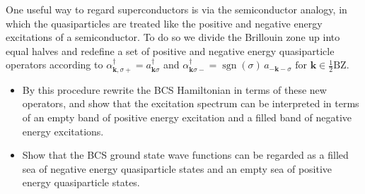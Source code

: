 \begin{Problem}

One useful way to regard superconductors is via the semiconductor analogy, in which the quasiparticles are treated like the positive and negative energy excitations of a semiconductor. To do so we divide the Brillouin zone up into equal halves and redefine a set of positive and negative energy quasiparticle operators according to
$\alpha^\dagger_{\mathbf{k},\sigma+} = a^\dagger_{\mathbf{k}\sigma}$ and $\alpha^\dagger_{\mathbf{k}\sigma-} = \operatorname{sgn}(\sigma)\,a_{-\mathbf{k}-\sigma}
\text{ for } \mathbf{k} \in \tfrac12 \mathrm{BZ}.$

\begin{itemize}
\item By this procedure rewrite the BCS Hamiltonian in terms of these new operators, and show that the excitation spectrum can be interpreted in terms of an empty band of positive energy excitation and a filled band of negative energy excitations.

\item Show that the BCS ground state wave functions can be regarded as a filled sea of negative energy quasiparticle states and an empty sea of positive energy quasiparticle states.
\end{itemize}
\end{Problem}
